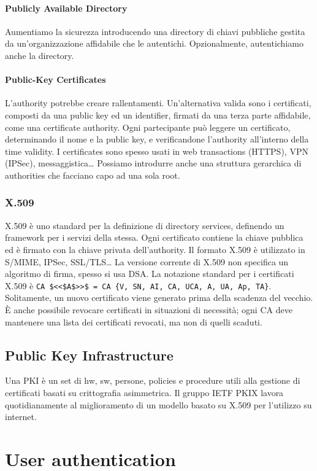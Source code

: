 \documentclass[11pt]{article}
\begin{document}
\paragraph{Publicly Available Directory} Aumentiamo la sicurezza introducendo una directory di chiavi pubbliche gestita da un'organizzazione affidabile che le autentichi. Opzionalmente, autentichiamo anche la directory. 
\paragraph{Public-Key Certificates} L'authority potrebbe creare rallentamenti. Un'alternativa valida sono i certificati, composti da una public key ed un identifier, firmati da una terza parte affidabile, come una certificate authority. Ogni partecipante può leggere un certificato, determinando il nome e la public key, e verificandone l'authority all'interno della time validity.
I certificates sono spesso usati in web transactions (HTTPS), VPN (IPSec), messaggistica\dots
Possiamo introdurre anche una struttura gerarchica di authorities che facciano capo ad una sola root. 
\subsubsection{X.509}
X.509 è uno standard per la definizione di directory services, definendo un framework per i servizi della stessa. Ogni certificato contiene la chiave pubblica ed è firmato con la chiave privata dell'authority. Il formato X.509 è utilizzato in S/MIME, IPSec, SSL/TLS\dots
La versione corrente di X.509 non specifica un algoritmo di firma, spesso si usa DSA. La notazione standard per i certificati X.509 è \verb|CA $<<$A$>>$ = CA {V, SN, AI, CA, UCA, A, UA, Ap, TA}|. Solitamente, un nuovo certificato viene generato prima della scadenza del vecchio. È anche possibile revocare certificati in situazioni di necessità; ogni CA deve mantenere una lista dei certificati revocati, ma non di quelli scaduti. 
\subsection{Public Key Infrastructure}
Una PKI è un set di hw, sw, persone, policies e procedure utili alla gestione di certificati basati su crittografia asimmetrica. Il gruppo IETF PKIX lavora quotidianamente al miglioramento di un modello basato su X.509 per l'utilizzo su internet.

\section{User authentication}
\end{document}
